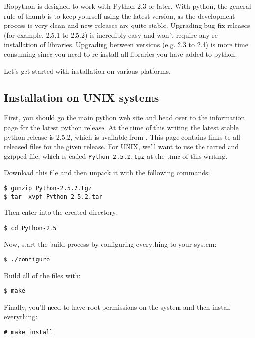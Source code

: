 \documentclass{article}
\begin{document}
Biopython is designed to work with Python 2.3 or later. With python, the
general rule of thumb is to keep yourself using the latest version, as
the development process is very clean and new releases are quite stable.
Upgrading bug-fix releases (for example. 2.5.1 to 2.5.2) 
is incredibly easy and won't require any re-installation of libraries.
Upgrading between versions (e.g. 2.3 to 2.4) is more time consuming since you
need to re-install all libraries you have added to python.

Let's get started with installation on various platforms.

\subsection{Installation on UNIX systems}

First, you should go the main python web site and head over to the information
page for the latest python release. At the time of this writing the
latest stable python release is 2.5.2, which is available from
. This page contains links
to all released files for the given release. For UNIX, we'll want to use
the tarred and gzipped file, which is called \verb|Python-2.5.2.tgz| at
the time of this writing.

Download this file and then unpack it with the following commands:

\begin{verbatim}
$ gunzip Python-2.5.2.tgz 
$ tar -xvpf Python-2.5.2.tar 
\end{verbatim}

Then enter into the created directory:

\begin{verbatim}
$ cd Python-2.5
\end{verbatim}

Now, start the build process by configuring everything to your system:

\begin{verbatim}
$ ./configure
\end{verbatim}

Build all of the files with:

\begin{verbatim}
$ make
\end{verbatim}

Finally, you'll need to have root permissions on the system and then
install everything:

\begin{verbatim}
# make install
\end{verbatim}
\end{document}
